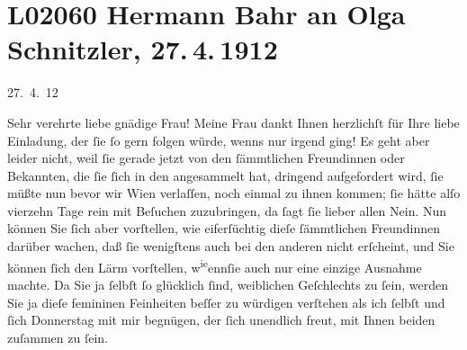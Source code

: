 

\section[Hermann Bahr an Olga Schnitzler, 27. 4. 1912]{L02060 Hermann Bahr an Olga Schnitzler, 27. 4. 1912}
\nopagebreak{}
\rehead{ }\normalsize\beginnumbering{}
\toendnotes[C]{\smallbreak\pagebreak[2]}
\toendnotes[C]{\smallbreak}
\pstart
           \raggedleft{}{\pb}27. 4. 12\pend
           
\pstart\center{}Sehr verehrte liebe gnädige Frau!\pend\vspace{0.5em}
\pstart
           Meine Frau dankt Ihnen
               herzlichſt für Ihre liebe Einladung, der ſie ſo gern folgen würde, wenns nur irgend
               ging! Es geht aber leider nicht, weil ſie gerade jetzt von den ſämmtlichen
               Freundinnen oder Bekannten, die ſie ſich in den \label{K_L02060-1v}\label{K_L02060-1} angesammelt hat, dringend
               aufgefordert wird, ſie müßte nun bevor wir Wien
               verlaſſen, noch einmal zu ihnen kommen; ſie hätte alſo vierzehn Tage rein mit
               Beſuchen zuzubringen, da ſagt ſie lieber allen Nein. Nun können Sie ſich aber
               vorſtellen, wie eiferſüchtig {\pb}dieſe ſämmtlichen
               Freundinnen darüber wachen, daß ſie wenigſtens auch bei den anderen nicht erſcheint,
               und Sie können ſich den Lärm vorſtellen, w\substVorne{}\textsuperscript{ie}\substDazwischen{}enn\substHinten{}{ }ſie auch nur eine einzige
               Ausnahme machte. Da Sie ja ſelbſt ſo glücklich ſind, weiblichen Geſchlechts zu ſein,
               werden Sie ja dieſe femininen Feinheiten beſſer zu würdigen verſtehen als ich ſelbſt
               und ſich Donnerstag mit mir begnügen, der ſich unendlich freut, mit
               Ihnen beiden zuſammen zu
               ſein.\pend
           
